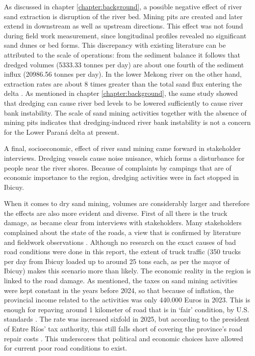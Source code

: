 As discussed in chapter \ref{chapter:background}, a possible negative effect of river sand extraction is disruption of the river bed. Mining pits are created and later extend in downstream as well as upstream directions. This effect was not found during field work measurement, since longitudinal profiles revealed no significant sand dunes or bed forms. This discrepancy with existing literature can be attributed to the scale of operations: from the sediment balance it follows that dredged volumes (5333.33 tonnes per day) are about one fourth of the sediment influx (20986.56 tonnes per day). In the lower Mekong river on the other hand, extraction rates are about 8 times greater than the total sand flux entering the delta \autocite{hackneyRiverBankInstability2020}. As mentioned in chapter \ref{chapter:background}, the same study showed that dredging can cause river bed levels to be lowered sufficiently to cause river bank instability. The scale of sand mining activities together with the absence of mining pits indicates that dredging-induced river bank instability is not a concern for the Lower Paraná delta at present.

A final, socioeconomic, effect of river sand mining came forward in stakeholder interviews. Dredging vessels cause noise nuisance, which forms a disturbance for people near the river shores. Because of complaints by campings that are of economic importance to the region, dredging activities were in fact stopped in Ibicuy.

When it comes to dry sand mining, volumes are considerably larger and therefore the effects are also more evident and diverse. First of all there is the truck damage, as became clear from interviews with stakeholders. Many stakeholders complained about the state of the roads, a view that is confirmed by literature and fieldwork observations \autocite{fogliaSedArena2023} \autocite{novasImpactoAmbientalOculto2022}. Although no research on the exact causes of bad road conditions were done in this report, the extent of truck traffic (350 trucks per day from Ibicuy loaded up to around 25 tons each, as per the mayor of Ibicuy) makes this scenario more than likely. The economic reality in the region is linked to the road damage. As mentioned, the taxes on sand mining activities were kept constant in the years before 2024, so that because of inflation, the provincial income related to the activities was only 440.000 Euros in 2023. This is enough for repaving around 1 kilometer of road that is in `fair' condition, by U.S. standards \autocite{crumbCostRoadMaintenance2024}. The rate was increased sixfold in 2025, but according to the president of Entre Ríos’ tax authority, this still falls short of covering the province’s road repair costs \autocite{bellatoEntreRiosFrigerio2025}. This underscores that political and economic choices have allowed for current poor road conditions to exist.

